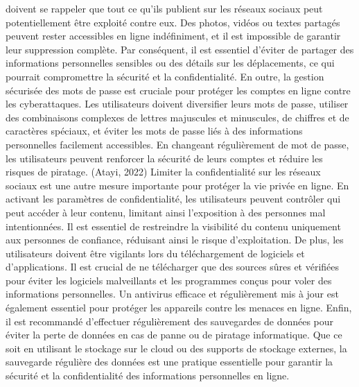 \documentclass[
]{article}
\begin{document}
doivent se rappeler que tout ce qu'ils publient sur les réseaux sociaux
peut potentiellement être exploité contre eux. Des photos, vidéos ou
textes partagés peuvent rester accessibles en ligne indéfiniment, et il
est impossible de garantir leur suppression complète. Par conséquent, il
est essentiel d'éviter de partager des informations personnelles
sensibles ou des détails sur les déplacements, ce qui pourrait
compromettre la sécurité et la confidentialité. En outre, la gestion
sécurisée des mots de passe est cruciale pour protéger les comptes en
ligne contre les cyberattaques. Les utilisateurs doivent diversifier
leurs mots de passe, utiliser des combinaisons complexes de lettres
majuscules et minuscules, de chiffres et de caractères spéciaux, et
éviter les mots de passe liés à des informations personnelles facilement
accessibles. En changeant régulièrement de mot de passe, les
utilisateurs peuvent renforcer la sécurité de leurs comptes et réduire
les risques de piratage. (Atayi, 2022) Limiter la confidentialité sur
les réseaux sociaux est une autre mesure importante pour protéger la vie
privée en ligne. En activant les paramètres de confidentialité, les
utilisateurs peuvent contrôler qui peut accéder à leur contenu, limitant
ainsi l'exposition à des personnes mal intentionnées. Il est essentiel
de restreindre la visibilité du contenu uniquement aux personnes de
confiance, réduisant ainsi le risque d'exploitation. De plus, les
utilisateurs doivent être vigilants lors du téléchargement de logiciels
et d'applications. Il est crucial de ne télécharger que des sources
sûres et vérifiées pour éviter les logiciels malveillants et les
programmes conçus pour voler des informations personnelles. Un antivirus
efficace et régulièrement mis à jour est également essentiel pour
protéger les appareils contre les menaces en ligne. Enfin, il est
recommandé d'effectuer régulièrement des sauvegardes de données pour
éviter la perte de données en cas de panne ou de piratage informatique.
Que ce soit en utilisant le stockage sur le cloud ou des supports de
stockage externes, la sauvegarde régulière des données est une pratique
essentielle pour garantir la sécurité et la confidentialité des
informations personnelles en ligne.
\end{document}
